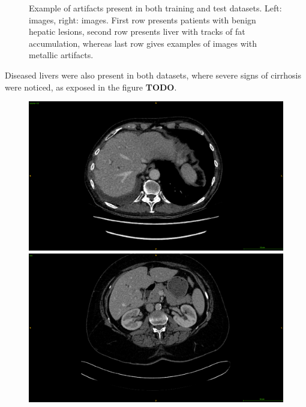 {\begin{figure}[!ht]
\begin{mdframed}[backgroundcolor=blue!50,linecolor=blue!50]
\begin{minipage}{6cm}
		\end{minipage}
	\end{mdframed}
	\caption{Example of artifacts present in both training and test datasets. Left: \textbf{} images, right: \textbf{} images. First row presents patients with benign hepatic lesions, second row presents liver with tracks of fat accumulation, whereas last row gives examples of images with metallic artifacts.}
	\label{fig:InterDb_artifacts}
\end{figure}
Diseased livers were also present in both datasets, where severe signs of cirrhosis were noticed, as exposed in the figure \textbf{TODO}.
\begin{figure}[!ht]
	\begin{mdframed}[backgroundcolor=blue!50,linecolor=blue!50]
		\centering
		\begin{minipage}{6cm}
			\includegraphics[width=\linewidth]{images/LITS_pat115_CirrhoticAspectLiverBorders}
		\end{minipage} \hspace{-0.1cm}
		\begin{minipage}{6cm}
			\includegraphics[width=\linewidth]{images/TCIA-BC-A10Z_cirrhoticAspect}

\end{minipage}
\end{mdframed}
\end{figure}}
